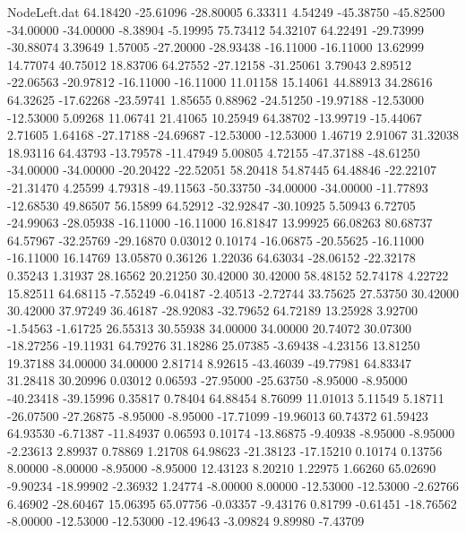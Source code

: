 \begin{filecontents}{NodeLeft.dat}
  64.18420  -25.61096  -28.80005     6.33311    4.54249  -45.38750  -45.82500  -34.00000  -34.00000   -8.38904   -5.19995   75.73412   54.32107
  64.22491  -29.73999  -30.88074     3.39649    1.57005  -27.20000  -28.93438  -16.11000  -16.11000   13.62999   14.77074   40.75012   18.83706
  64.27552  -27.12158  -31.25061     3.79043    2.89512  -22.06563  -20.97812  -16.11000  -16.11000   11.01158   15.14061   44.88913   34.28616
  64.32625  -17.62268  -23.59741     1.85655    0.88962  -24.51250  -19.97188  -12.53000  -12.53000    5.09268   11.06741   21.41065   10.25949
  64.38702  -13.99719  -15.44067     2.71605    1.64168  -27.17188  -24.69687  -12.53000  -12.53000    1.46719    2.91067   31.32038   18.93116
  64.43793  -13.79578  -11.47949     5.00805    4.72155  -47.37188  -48.61250  -34.00000  -34.00000  -20.20422  -22.52051   58.20418   54.87445
  64.48846  -22.22107  -21.31470     4.25599    4.79318  -49.11563  -50.33750  -34.00000  -34.00000  -11.77893  -12.68530   49.86507   56.15899
  64.52912  -32.92847  -30.10925     5.50943    6.72705  -24.99063  -28.05938  -16.11000  -16.11000   16.81847   13.99925   66.08263   80.68737
  64.57967  -32.25769  -29.16870     0.03012    0.10174  -16.06875  -20.55625  -16.11000  -16.11000   16.14769   13.05870    0.36126    1.22036
  64.63034  -28.06152  -22.32178     0.35243    1.31937   28.16562   20.21250   30.42000   30.42000   58.48152   52.74178    4.22722   15.82511
  64.68115   -7.55249   -6.04187    -2.40513   -2.72744   33.75625   27.53750   30.42000   30.42000   37.97249   36.46187  -28.92083  -32.79652
  64.72189   13.25928    3.92700    -1.54563   -1.61725   26.55313   30.55938   34.00000   34.00000   20.74072   30.07300  -18.27256  -19.11931
  64.79276   31.18286   25.07385    -3.69438   -4.23156   13.81250   19.37188   34.00000   34.00000    2.81714    8.92615  -43.46039  -49.77981
  64.83347   31.28418   30.20996     0.03012    0.06593  -27.95000  -25.63750   -8.95000   -8.95000  -40.23418  -39.15996    0.35817    0.78404
  64.88454    8.76099   11.01013     5.11549    5.18711  -26.07500  -27.26875   -8.95000   -8.95000  -17.71099  -19.96013   60.74372   61.59423
  64.93530   -6.71387  -11.84937     0.06593    0.10174  -13.86875   -9.40938   -8.95000   -8.95000   -2.23613    2.89937    0.78869    1.21708
  64.98623  -21.38123  -17.15210     0.10174    0.13756    8.00000   -8.00000   -8.95000   -8.95000   12.43123    8.20210    1.22975    1.66260
  65.02690   -9.90234  -18.99902    -2.36932    1.24774   -8.00000    8.00000  -12.53000  -12.53000   -2.62766    6.46902  -28.60467   15.06395
  65.07756   -0.03357   -9.43176     0.81799   -0.61451  -18.76562   -8.00000  -12.53000  -12.53000  -12.49643   -3.09824    9.89980   -7.43709

\end{filecontents}
